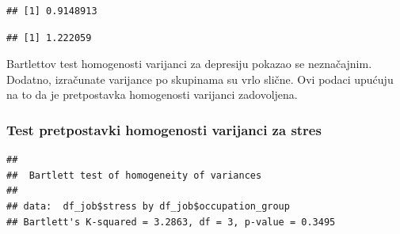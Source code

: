 \documentclass[
]{article}
\newenvironment{Shaded}{\begin{snugshade}}{\end{snugshade}}
\newcommand{\FunctionTok}[1]{\textcolor[rgb]{0.13,0.29,0.53}{\textbf{#1}}}
\newcommand{\NormalTok}[1]{#1}
\newcommand{\SpecialCharTok}[1]{\textcolor[rgb]{0.81,0.36,0.00}{\textbf{#1}}}
\newcommand{\StringTok}[1]{\textcolor[rgb]{0.31,0.60,0.02}{#1}}
\begin{document}
\begin{verbatim}
## [1] 0.9148913
\end{verbatim}

\begin{Shaded}
\end{Shaded}

\begin{verbatim}
## [1] 1.222059
\end{verbatim}

Bartlettov test homogenosti varijanci za depresiju pokazao se
neznačajnim. Dodatno, izračunate varijance po skupinama su vrlo slične.
Ovi podaci upućuju na to da je pretpostavka homogenosti varijanci
zadovoljena.

\subsubsection{Test pretpostavki homogenosti varijanci za
stres}\label{test-pretpostavki-homogenosti-varijanci-za-stres}

\begin{Shaded}
\end{Shaded}

\begin{verbatim}
## 
##  Bartlett test of homogeneity of variances
## 
## data:  df_job$stress by df_job$occupation_group
## Bartlett's K-squared = 3.2863, df = 3, p-value = 0.3495
\end{verbatim}

\begin{Shaded}
\end{Shaded}
\end{document}
